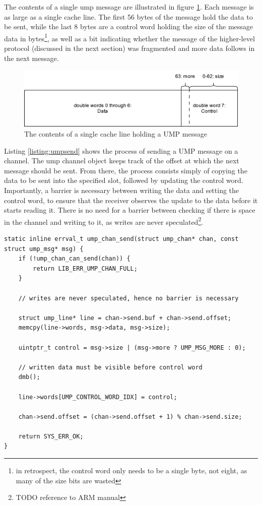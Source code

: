The contents of a single ump message are illustrated in figure \ref{fig:rpc:umpline}. Each message is as large as a single cache line. The first 56 bytes of the message hold the data to be sent, while the last 8 bytes are a control word holding the size of the message data in bytes\footnote{in retrospect, the control word only needs to be a single byte, not eight, as many of the size bits are wasted}, as well as a bit indicating whether the message of the higher-level protocol (discussed in the next section) was fragmented and more data follows in the next message.

\begin{figure}[htp]
    \centering
    \includegraphics[width=12cm]{images/rpc/ump_line.png}
    \caption{The contents of a single cache line holding a UMP message}
    \label{fig:rpc:umpline}
\end{figure}

Listing \ref{listing:umpsend} shows the process of sending a UMP message on a channel. The ump channel object keeps track of the offset at which the next message should be sent. From there, the process consists simply of copying the data to be sent into the specified slot, followed by updating the control word. Importantly, a barrier is necessary between writing the data and setting the control word, to ensure that the receiver observes the update to the data before it starts reading it. There is no need for a barrier between checking if there is space in the channel and writing to it, as writes are never speculated\footnote{TODO reference to ARM manual}.

\begin{lstlisting}[caption={Sending a UMP message},label={listing:umpsend}]
static inline errval_t ump_chan_send(struct ump_chan* chan, const struct ump_msg* msg) {
    if (!ump_chan_can_send(chan)) {
        return LIB_ERR_UMP_CHAN_FULL;
    }
    
    // writes are never speculated, hence no barrier is necessary
    
    struct ump_line* line = chan->send.buf + chan->send.offset;
    memcpy(line->words, msg->data, msg->size);

    uintptr_t control = msg->size | (msg->more ? UMP_MSG_MORE : 0);

    // written data must be visible before control word
    dmb();

    line->words[UMP_CONTROL_WORD_IDX] = control;

    chan->send.offset = (chan->send.offset + 1) % chan->send.size;

    return SYS_ERR_OK;
}
\end{lstlisting}

